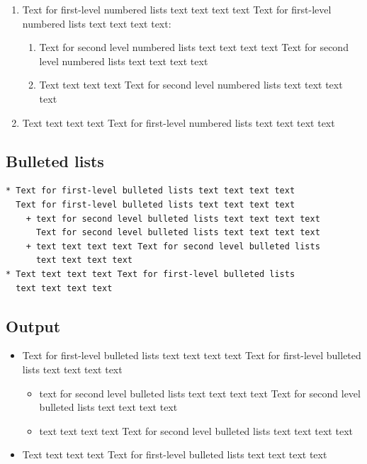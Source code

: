 \documentclass[]{imag-ms-template}
\providecommand{\tightlist}{%
  \setlength{\itemsep}{0pt}\setlength{\parskip}{0pt}}\usepackage{longtable,booktabs,array}
\theoremstyle{plain}
\theoremstyle{remark}
\begin{document}
\begin{enumerate}
\def\labelenumi{\arabic{enumi}.}
\tightlist
\item
  Text for first-level numbered lists text text text text Text for
  first-level numbered lists text text text text:

  \begin{enumerate}
  \def\labelenumii{\alph{enumii}.}
  \tightlist
  \item
    Text for second level numbered lists text text text text Text for
    second level numbered lists text text text text
  \item
    Text text text text Text for second level numbered lists text text
    text text
  \end{enumerate}
\item
  Text text text text Text for first-level numbered lists text text text
  text
\end{enumerate}

\subsection*{Bulleted lists}\label{bulleted-lists}

\begin{verbatim}
* Text for first-level bulleted lists text text text text
  Text for first-level bulleted lists text text text text 
    + text for second level bulleted lists text text text text
      Text for second level bulleted lists text text text text 
    + text text text text Text for second level bulleted lists
      text text text text 
* Text text text text Text for first-level bulleted lists
  text text text text 
\end{verbatim}

\subsection*{Output}\label{output-3}

\begin{itemize}
\tightlist
\item
  Text for first-level bulleted lists text text text text Text for
  first-level bulleted lists text text text text

  \begin{itemize}
  \tightlist
  \item
    text for second level bulleted lists text text text text Text for
    second level bulleted lists text text text text
  \item
    text text text text Text for second level bulleted lists text text
    text text
  \end{itemize}
\item
  Text text text text Text for first-level bulleted lists text text text
  text
\end{itemize}
\end{document}
